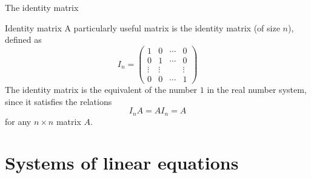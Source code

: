 \documentclass[9pt]{beamer}
\begin{document}
\begin{frame}{The identity matrix}

    \begin{block}{Identity matrix}
        A particularly useful matrix is the identity matrix (of size $n$), defined as
        $$
        I_{n} = 
        \begin{pmatrix}
        1      & 0      & \cdots & 0  \\
        0      & 1      & \cdots & 0  \\
        \vdots & \vdots &        & \vdots  \\
        0      & 0      & \cdots & 1  
        \end{pmatrix}
        $$
        The identity matrix is the equivalent of the number $1$ in the real number system, since it satisfies the relations 
        $$
        I_nA = AI_n = A
        $$
        for any $n\times n$ matrix $A$.
    \end{block}
    
\end{frame}


\section{Systems of linear equations}
\end{document}

